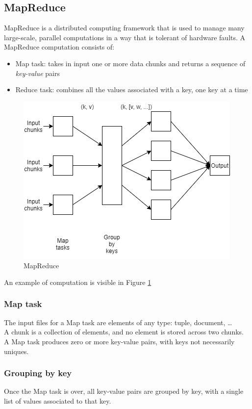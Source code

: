 \documentclass[\main/main.tex]{subfiles}
\begin{document}
\subsection{MapReduce}
MapReduce \cite{Dean2004MapReduceSD} is a distributed computing framework that is used to manage many large-scale, parallel computations in a way that is tolerant of hardware faults. A MapReduce computation consists of:
\begin{itemize}
    \item Map task: takes in input one or more data chunks and returns a sequence of \emph{key-value} pairs
    \item Reduce task: combines all the values associated with a key, one key at a time
\end{itemize}
\begin{figure}[H]
    \centering
    \includegraphics[scale=0.55]{images/cluster_computing/map_reduce_schema.png}
    \caption{MapReduce}
    \label{fig:map_reduce}
\end{figure}
An example of computation is visible in Figure \ref{fig:map_reduce}
\subsubsection{Map task}
The input files for a Map task are elements of any type: tuple, document, \dots \\
A chunk is a collection of elements, and no element is stored across two chunks. 
A Map task produces zero or more key-value pairs, with keys not necessarily uniques.
\subsubsection{Grouping by key}
Once the Map task is over, all key-value pairs are grouped by key, with a single list of values associated to that key.
\end{document}
